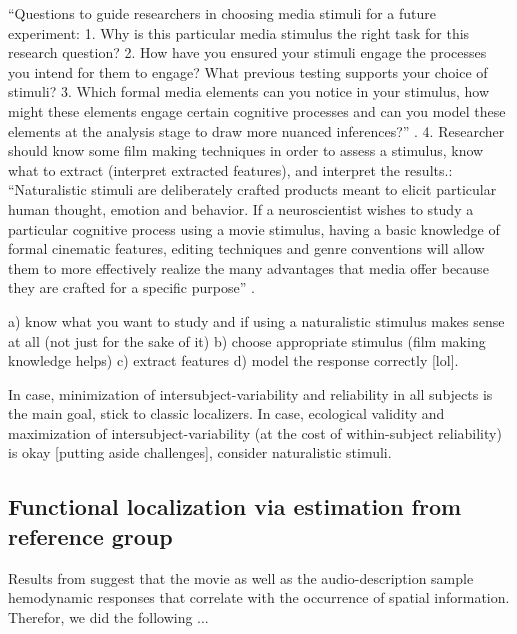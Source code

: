 %
``Questions to guide researchers in choosing media stimuli for a future
experiment:
%
1. Why is this particular media stimulus the right task for this research
question?
%
2. How have you ensured your stimuli engage the processes you intend for them to
engage? What previous testing supports your choice of stimuli?
%
3. Which formal media elements can you notice in your stimulus, how might these
elements engage certain cognitive processes and can you model these elements at
the analysis stage to draw more nuanced inferences?''
\citep{grall2022leveraging}.  4. Researcher should know some film making
techniques in order to assess a stimulus, know what to extract (interpret
extracted features), and interpret the results.: ``Naturalistic stimuli are
deliberately crafted products meant to elicit particular human thought, emotion
and behavior.
%
If a neuroscientist wishes to study a particular cognitive process using a movie
stimulus, having a basic knowledge of formal cinematic features, editing
techniques and genre conventions will allow them to more effectively realize the
many advantages that media offer because they are crafted for a specific
purpose'' \citep{grall2022leveraging}.

%
a) know what you want to study and if using a naturalistic stimulus makes sense
at all (not just for the sake of it)
%
b) choose appropriate stimulus (film making knowledge helps)
%
c) extract features
%
d) model the response correctly [lol].

In case, minimization of intersubject-variability and reliability in all
subjects is the main goal, stick to classic localizers.
%
In case, ecological validity and maximization of intersubject-variability (at
the cost of within-subject reliability) is okay [putting aside challenges],
consider naturalistic stimuli.



\subsection{Functional localization via estimation from reference group}



%
Results from \citet{haeusler2022processing} suggest that the movie as well as
the audio-description sample hemodynamic responses that correlate with the
occurrence of spatial information.
%
Therefor, we did the following ...

